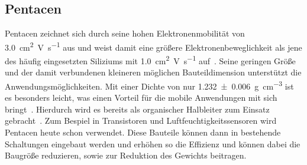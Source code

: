         \subsection{Pentacen} \label{sec:5A}
            Pentacen zeichnet sich durch seine hohen Elektronenmobilität von \SI{3.0}{\centi\meter\squared\volt\per\second} aus und weist damit eine größere Elektronenbeweglichkeit als jene des häufig eingesetzten Siliziums mit \SI{1.0}{\centi\meter\squared\volt\per\second} auf~\cite{5A_13}.
            Seine geringen Größe und der damit verbundenen kleineren möglichen Bauteildimension unterstützt die Anwendungsmöglichkeiten.
            Mit einer Dichte von nur \SI{1.232(6)}{\gram\per\cubic\centi\meter} ist es besonders leicht, was einen Vorteil für die mobile Anwendungen mit sich bringt~\cite{CAS}.
            Hierdurch wird es bereits als organischer Halbleiter zum Einsatz gebracht~\cite{5A_4}.
            Zum Bespiel in Transistoren \cite{5A_14, 5A_13} und Luftfeuchtigkeitssensoren \cite{demelas_chemical_2015} wird Pentacen heute schon verwendet.
            Diese Bauteile können dann in bestehende Schaltungen eingebaut werden und erhöhen so die Effizienz und können dabei die Baugröße reduzieren, sowie zur Reduktion des Gewichts beitragen.
  

